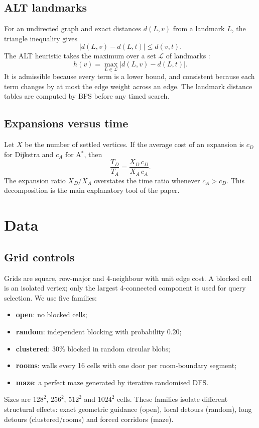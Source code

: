 \documentclass[conference,10pt]{IEEEtran}
\newcommand{\Astar}{A$^\ast$}
\begin{document}
\subsection{ALT landmarks}
For an undirected graph and exact distances $d(L,v)$ from a landmark $L$,
the triangle inequality gives
\begin{equation}
  |d(L,v)-d(L,t)| \le d(v,t).
\end{equation}
The ALT heuristic takes the maximum over a set $\mathcal{L}$ of landmarks
\cite{goldberg2005}:
\begin{equation}
  h(v)=\max_{L\in\mathcal{L}} |d(L,v)-d(L,t)|.
  \label{eq:alt}
\end{equation}
It is admissible because every term is a lower bound, and consistent because
each term changes by at most the edge weight across an edge.  The landmark
distance tables are computed by BFS before any timed search.

\subsection{Expansions versus time}
Let $X$ be the number of settled vertices.  If the average cost of an expansion
is $c_D$ for Dijkstra and $c_A$ for \Astar{}, then
\begin{equation}
  \frac{T_D}{T_A}=\frac{X_D\,c_D}{X_A\,c_A}.
\end{equation}
The expansion ratio $X_D/X_A$ overstates the time ratio whenever $c_A>c_D$.
This decomposition is the main explanatory tool of the paper.

\section{Data}
\label{sec:data}

\subsection{Grid controls}
Grids are square, row-major and 4-neighbour with unit edge cost.  A blocked cell
is an isolated vertex; only the largest 4-connected component is used for query
selection.  We use five families:
\begin{itemize}
  \item \textbf{open}: no blocked cells;
  \item \textbf{random}: independent blocking with probability 0.20;
  \item \textbf{clustered}: 30\% blocked in random circular blobs;
  \item \textbf{rooms}: walls every 16 cells with one door per room-boundary
        segment;
  \item \textbf{maze}: a perfect maze generated by iterative randomised DFS.
\end{itemize}
Sizes are $128^2$, $256^2$, $512^2$ and $1024^2$ cells.  These families isolate
different structural effects: exact geometric guidance (open), local detours
(random), long detours (clustered/rooms) and forced corridors (maze).
\end{document}
